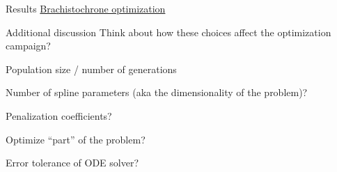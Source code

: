\documentclass[presentation]{beamer}
\begin{document}
\begin{frame}[label={sec:org2ec7ed8}]{Results}
\href{file:///Users/tp5/code/optex/brachistochrone.mp4}{Brachistochrone optimization}
\end{frame}
\begin{frame}[label={sec:orga92e82c}]{Additional discussion}
Think about how these choices affect the optimization campaign?
\begin{block}{Population size / number of generations}
\end{block}
\begin{block}{Number of spline parameters (aka the dimensionality of the problem)?}
\end{block}
\begin{block}{Penalization coefficients?}
\end{block}
\begin{block}{Optimize ``part'' of the problem?}
\end{block}
\begin{block}{Error tolerance of ODE solver?}
\end{block}
\end{frame}
\end{document}
